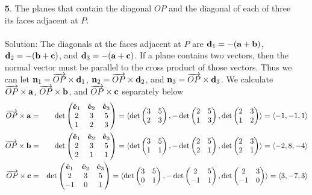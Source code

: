 \documentclass[12pt]{amsbook}
\newcommand{\la}{\langle}
\newcommand{\ra}{\rangle}
\begin{document}
\begin{enumerate}
\item[{\small\bf 5}.]  The planes that contain the 
diagonal $OP$ and  the diagonal 
of each of three its faces adjacent at $P$. 
\\
\\
{\sc Solution}:
The diagonals at the faces adjacent at $P$ are ${\bf d}_1=-({\bf a}+{\bf b})$, ${\bf d}_2=-({\bf b}+{\bf c})$, and ${\bf d}_3=-({\bf a}+{\bf c})$. If a plane contains two vectors, then the normal vector must be parallel to the cross product of those vectors. Thus we can let ${\bf n}_1=\overrightarrow{OP}\times{\bf d}_1$, ${\bf n}_2=\overrightarrow{OP}\times{\bf d}_2$, and ${\bf n}_3=\overrightarrow{OP}\times{\bf d}_3$. We calculate $\overrightarrow{OP}\times{\bf a}$, $\overrightarrow{OP}\times{\bf b}$, and $\overrightarrow{OP}\times{\bf c}$ separately below
\begin{eqnarray*}
\overrightarrow{OP}\times{\bf a}&=&\det
\begin{pmatrix}
\hat{\bf e}_1 & \hat{\bf e}_2 & \hat{\bf e}_3\cr 2&3&5\cr 1&2&3 \end{pmatrix}=\la \det\begin{pmatrix}3&5\cr 2&3  \end{pmatrix},-\det\begin{pmatrix}2&5\cr 1&3  \end{pmatrix},\det\begin{pmatrix}2&3\cr 1&2 \end{pmatrix} \ra =\la -1,-1,1 \ra \\
\overrightarrow{OP}\times{\bf b}&=&\det
\begin{pmatrix}
\hat{\bf e}_1 & \hat{\bf e}_2 & \hat{\bf e}_3\cr 2&3&5\cr 2&1&1 \end{pmatrix}=\la \det\begin{pmatrix}3&5\cr 1&1  \end{pmatrix},-\det\begin{pmatrix}2&5\cr 2&1  \end{pmatrix},\det\begin{pmatrix}2&3\cr 2&1 \end{pmatrix} \ra =\la -2,8,-4 \ra \\
\overrightarrow{OP}\times{\bf c}&=&\det
\begin{pmatrix}
\hat{\bf e}_1 & \hat{\bf e}_2 & \hat{\bf e}_3\cr 2&3&5\cr -1&0&1 \end{pmatrix}=\la \det\begin{pmatrix}3&5\cr 0&1  \end{pmatrix},-\det\begin{pmatrix}2&5\cr -1&1  \end{pmatrix},\det\begin{pmatrix}2&3\cr -1&0 \end{pmatrix} \ra =\la 3,-7,3 \ra 

\end{eqnarray*}
\end{enumerate}
\end{document}
